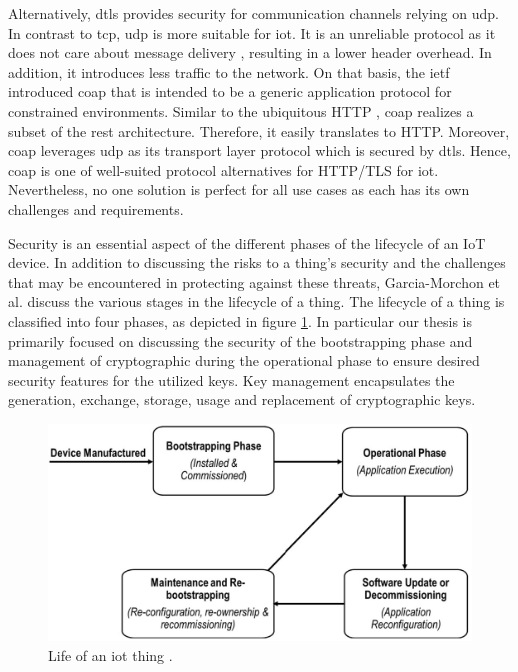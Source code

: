 Alternatively, \gls{dtls} \cite{dtls} provides security for communication channels relying on \gls{udp}. In contrast to \gls{tcp}, \gls{udp} is more suitable for \gls{iot}. It is an unreliable protocol as it does not care about message delivery , resulting in a lower header overhead. In addition, it introduces less traffic to the network. On that basis, the \gls{ietf} introduced \gls{coap} \cite{rfc7252} that is intended to be a generic application protocol for constrained environments. Similar to the ubiquitous HTTP \cite{http}, \gls{coap} realizes a subset of the \gls{rest} architecture. Therefore, it easily translates to HTTP. Moreover, \gls{coap} leverages \gls{udp} as its transport layer protocol which is secured by \gls{dtls}. Hence, \gls{coap} is one of well-suited protocol alternatives for HTTP/TLS for \gls{iot}. Nevertheless, no one solution is perfect for all use cases as each has its own challenges and requirements.
\par
Security is an essential aspect of the different phases of the lifecycle of an IoT device. In addition to discussing the risks to a thing's security and the challenges that may be encountered in protecting against these threats, Garcia-Morchon et al. \cite{rfc8576} discuss the various stages in the lifecycle of a thing. The lifecycle of a thing is classified into four phases, as depicted in figure \ref{fig:iot-lifecycle}. In particular our thesis is primarily focused on discussing the security of the bootstrapping phase and management of cryptographic during the operational phase to ensure desired security features for the utilized keys. Key management encapsulates the generation, exchange, storage, usage and replacement of cryptographic keys.
\begin{figure}[htbp]
	\centering
	\includegraphics[scale=0.35]{Images/iot-lifecycle.jpg}
	\caption{Life of an \gls{iot} thing \cite{bs-survey}.}
	\label{fig:iot-lifecycle}
\end{figure}

